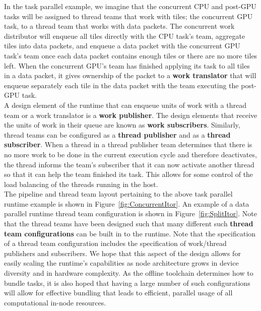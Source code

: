 \documentclass{article}
\begin{document}
In the task parallel example, we imagine that the concurrent CPU and post-GPU
tasks will be assigned to thread teams that work with tiles; the concurrent GPU
task, to a thread team that works with data packets.  The concurrent work
distributor will enqueue all tiles directly with the CPU task's team, aggregate
tiles into data packets, and enqueue a data packet with the concurrent GPU
task's team once each data packet contains enough tiles or there are no more
tiles left.  When the concurrent GPU's team has finished applying its task to
all tiles in a data packet, it gives ownership of the packet to a \textbf{work
translator} that will enqueue separately each tile in the data packet with the
team executing the post-GPU task.\\

A design element of the runtime that can enqueue units of work with a thread
team or a work translator is a \textbf{work publisher}.  The design elements
that receive the units of work in their queue are known as \textbf{work
subscribers}.  Similarly, thread teams can be configured as a \textbf{thread
publisher} and as a \textbf{thread subscriber}.  When a thread in a thread
publisher team determines that there is no more work to be done in the current
execution cycle and therefore deactivates, the thread informs the team's
subscriber that it can now activate another thread so that it can help the team
finished its task.  This allows for some control of the load balancing of the
threads running in the host.\\

The pipeline and thread team layout pertaining to the above task parallel
runtime example is shown in Figure~\ref{fig:ConcurrentItor}.  An example of a
data parallel runtime thread team configuration is shown in
Figure~\ref{fig:SplitItor}.  Note that the thread teams have been designed such
that many different such \textbf{thread team configurations} can be built in to the
runtime.  Note that the specification of a thread team configuration includes the
specification of work/thread publishers and subscribers.  We hope that this
aspect of the design allows for easily scaling the runtime's capabilities as
node architecture grows in device diversity and in hardware complexity.  As the
offline toolchain determines how to bundle tasks, it is also hoped that having a
large number of such configurations will allow for effective bundling that leads
to efficient, parallel usage of all computational in-node resources.\\
\end{document}
